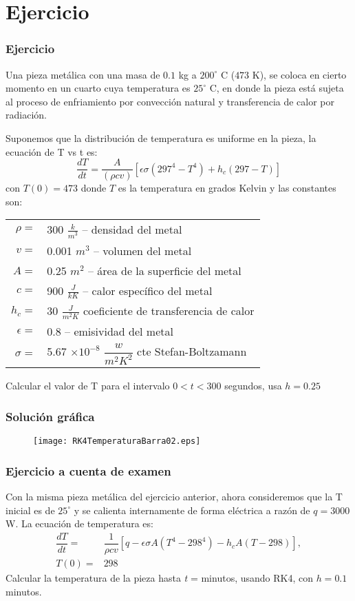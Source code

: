 \section{Ejercicio}
\begin{frame}
\frametitle{Ejercicio}
Una pieza met\'{a}lica con una masa de $0.1$ kg a $200^{\circ}$ C  ($473$ K), se coloca en cierto momento en un cuarto cuya temperatura es $25^{\circ}$ C, en donde la pieza est\'{a} sujeta al proceso de enfriamiento por convecci\'{o}n natural y transferencia de calor por radiaci\'{o}n.
\end{frame}
\begin{frame}
Suponemos que la distribuci\'{o}n de temperatura es uniforme en la pieza, la ecuaci\'{o}n de T vs t es:
\[ \dfrac{dT}{dt} =  \dfrac{A}{(\rho c v)} [ \epsilon \sigma (297^{4} - T^{4})+ h_{c}(297-T)] \]
con $T(0)=473$ donde $T$ es la temperatura en grados Kelvin y las constantes son:
\end{frame}
\begin{frame}
\begin{tabular}{r l}
	$\rho =$  & 300 $\frac{k}{m^{3}}$ -- densidad del metal \\
	$v=$  & 0.001 $m^{3}$ -- volumen del metal \\
	$A=$ & 0.25 $m^{2}$ -- \'{a}rea de la superficie del metal \\
	$c=$ & 900 $\frac{J}{kK}$ -- calor espec\'{i}fico del metal \\
	$h_{c}=$ & 30 $\frac{J}{m^{2}K}$ coeficiente de transferencia de calor \\
	$\epsilon=$ & 0.8 -- emisividad del metal \\
	$\sigma=$ & 5.67 $\times 10^{-8}$ $\dfrac{w}{m^{2}K^{2}}$ cte Stefan-Boltzamann
\end{tabular}
Calcular el valor de T para el intervalo $0 < t < 300$ segundos, usa $h=0.25$
\end{frame}
\begin{frame}[fragile]
\frametitle{Soluci\'{o}n gr\'{a}fica}
\begin{figure}
	\centering
	\texttt{[image: RK4TemperaturaBarra02.eps]} 
\end{figure}
\end{frame}
\begin{frame}
\frametitle{Ejercicio a cuenta de examen}
Con la misma pieza met\'{a}lica del ejercicio anterior, ahora consideremos que la T inicial es de $25^{\circ}$ y se calienta internamente de forma el\'{e}ctrica a raz\'{o}n de $q=3000$ W. La ecuaci\'{o}n de temperatura es:
\[ \begin{split}
\dfrac{dT}{dt} =& \dfrac{1}{\rho c v} \left[ q - \epsilon \sigma A \left( T^{4} - 298^{4} \right) - h_{c} A \left( T - 298 \right) \right], \\
 T(0) =& 298
 \end{split} \]
Calcular la temperatura de la pieza hasta \textit{t} = minutos, usando RK4, con $h=0.1$ minutos.
\end{frame}
